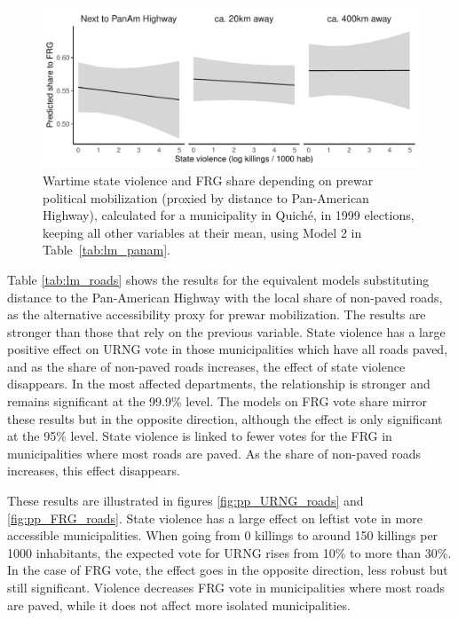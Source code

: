 \documentclass[12pt, notitlepage]{article}
\begin{document}
\begin{figure}[htb!]
  \centering
    \includegraphics[width = .75\textwidth]{img/pp_FRG_panam}

  \caption{Wartime state violence and FRG share depending on prewar political mobilization (proxied by distance to Pan-American Highway), calculated for a municipality in Quiché, in 1999 elections, keeping all other variables at their mean, using Model 2 in Table~\ref{tab:lm_panam}.} \label{fig:pp_FRG_panam}


\end{figure}

Table \ref{tab:lm_roads} shows the results for the equivalent models substituting distance to the Pan-American Highway with the local share of non-paved roads, as the alternative accessibility proxy for prewar mobilization.
The results are stronger than those that rely on the previous variable.
State violence has a large positive effect on URNG vote in those municipalities which have all roads paved, and as the share of non-paved roads increases, the effect of state violence disappears.
In the most affected departments, the relationship is stronger and remains significant at the 99.9\% level.
The models on FRG vote share mirror these results but in the opposite direction, although the effect is only significant at the 95\% level.
State violence is linked to fewer votes for the FRG in municipalities where most roads are paved. As the share of non-paved roads increases, this effect disappears.



These results are illustrated in figures \ref{fig:pp_URNG_roads} and \ref{fig:pp_FRG_roads}.
State violence has a large effect on leftist vote in more accessible municipalities.
When going from 0 killings to around 150 killings per 1000 inhabitants, the expected vote for URNG rises from 10\% to more than 30\%.
In the case of FRG vote, the effect goes in the opposite direction, less robust but still significant.
Violence decreases FRG vote in municipalities where most roads are paved, while it does not affect more isolated municipalities.
\end{document}
